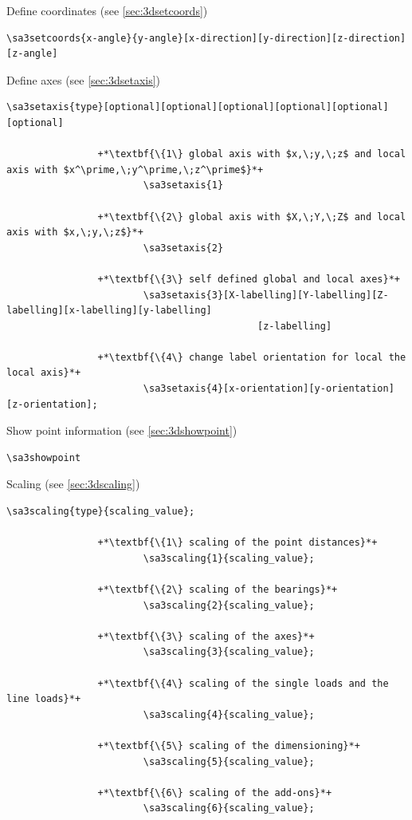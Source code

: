 \documentclass[%
  a4paper,
  BCOR=20mm,
  numbers=noenddot,
  twoside,
  parskip=half,
  openright,
  version=last,
]{scrreprt}
\begin{document}
Define coordinates (see \ref{sec:3dsetcoords})

\begin{lstlisting}[emph={setcoords},backgroundcolor=\color{white}]
		\sa3setcoords{x-angle}{y-angle}[x-direction][y-direction][z-direction][z-angle]
\end{lstlisting}\vspace{-10mm}

Define axes (see \ref{sec:3dsetaxis})

\begin{lstlisting}[emph={setaxis},backgroundcolor=\color{white}]
		\sa3setaxis{type}[optional][optional][optional][optional][optional][optional]
		
				+*\textbf{\{1\} global axis with $x,\;y,\;z$ and local axis with $x^\prime,\;y^\prime,\;z^\prime$}*+
						\sa3setaxis{1}
						
				+*\textbf{\{2\} global axis with $X,\;Y,\;Z$ and local axis with $x,\;y,\;z$}*+
						\sa3setaxis{2}
						
				+*\textbf{\{3\} self defined global and local axes}*+
						\sa3setaxis{3}[X-labelling][Y-labelling][Z-labelling][x-labelling][y-labelling]
											[z-labelling]
						
				+*\textbf{\{4\} change label orientation for local the local axis}*+
						\sa3setaxis{4}[x-orientation][y-orientation][z-orientation];										
\end{lstlisting}\vspace{-10mm}

Show point information (see \ref{sec:3dshowpoint})

\begin{lstlisting}[emph={showpoint},backgroundcolor=\color{white}]
		\sa3showpoint
\end{lstlisting}\vspace{-10mm}

Scaling (see \ref{sec:3dscaling})

\begin{lstlisting}[emph={dscaling},backgroundcolor=\color{white}]
		\sa3scaling{type}{scaling_value};
		
				+*\textbf{\{1\} scaling of the point distances}*+
						\sa3scaling{1}{scaling_value};
						
				+*\textbf{\{2\} scaling of the bearings}*+
						\sa3scaling{2}{scaling_value};
						
				+*\textbf{\{3\} scaling of the axes}*+
						\sa3scaling{3}{scaling_value};
						
				+*\textbf{\{4\} scaling of the single loads and the line loads}*+
						\sa3scaling{4}{scaling_value};
						
				+*\textbf{\{5\} scaling of the dimensioning}*+
						\sa3scaling{5}{scaling_value};
						
				+*\textbf{\{6\} scaling of the add-ons}*+
						\sa3scaling{6}{scaling_value};
\end{lstlisting}\vspace{-10mm}
\end{document}
